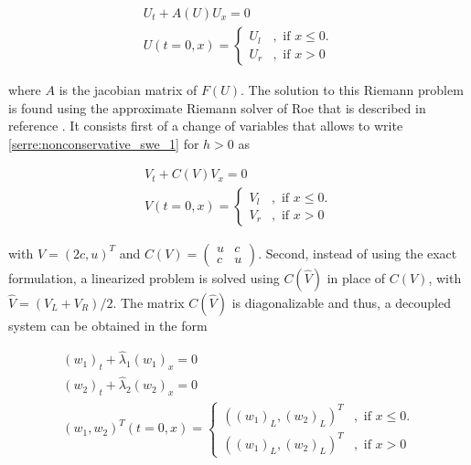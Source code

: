 \begin{equation}
	\begin{split}
	  U_t + A(U) U_x = 0 \\
	  U(t=0,x) = \begin{cases}
		 U_l &, \text{ if } x\leq 0. \\
		 U_r &, \text{ if } x > 0 
		\end{cases}
	\end{split}
	\label{serre:nonconservative_swe_1}
\end{equation}

 where $A$ is the jacobian matrix of $F(U)$. The solution to this Riemann problem is found using the approximate Riemann solver of Roe that is described in reference \cite{marche2006}. It consists first of a change of variables that allows to write \eqref{serre:nonconservative_swe_1} for $h>0$ as

\begin{equation}
	\begin{split}
	  V_t + C(V)V_x = 0 \\
	  V(t=0,x) = \begin{cases}
		V_l &, \text{ if } x\leq 0. \\
	 V_r &, \text{ if } x > 0 
		\end{cases}
	\end{split}
	\label{serre:nonconservative_swe_2}
\end{equation}

 with $V = (2c,u)^T$ and 
$C(V) = \left( 
\begin{array}{cc} 
u & c \\ 
c & u \end{array}\right)$. Second, instead of using the exact formulation, a linearized problem is solved using $C(\hat V)$ in place of $C(V)$, with $\hat V = (V_L +V_R)/2$. The matrix $C(\hat V)$ is diagonalizable and thus, a decoupled system can be obtained in the form

\begin{equation}
	\begin{split}
		(w_1)_t + \hat \lambda_1 (w_1)_x = 0\\
		(w_2)_t + \hat \lambda_2 (w_2)_x = 0 \\	
	(w_1,w_2)^T(t=0,x) = \begin{cases}
		((w_1)_L,(w_2)_L)^T &, \text{ if } x\leq 0. \\
		((w_1)_L,(w_2)_L)^T &, \text{ if } x > 0 
		\end{cases}
	\end{split}
\end{equation}

